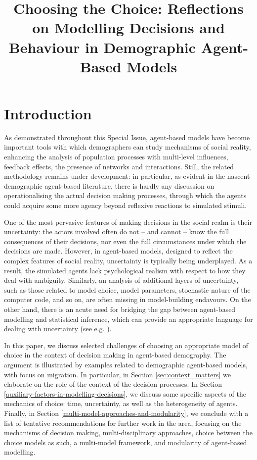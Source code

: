 \documentclass{article}
\begin{document}
\title{Choosing the Choice: Reflections on Modelling Decisions and Behaviour in Demographic Agent-Based Models}

\maketitle

\section{Introduction}
\label{sec:intro}

As demonstrated throughout this Special Issue, agent-based models have become important tools with which demographers can study mechanisms of social reality, enhancing the analysis of population processes with multi-level influences, feedback effects, the presence of networks and interactions. Still, the related methodology remains under development: in particular, as evident in the nascent demographic agent-based literature, there is hardly any discussion on operationalising the actual decision making processes, through which the agents could acquire some more agency beyond reflexive reactions to simulated stimuli. 

One of the most pervasive features of making decisions in the social realm is their uncertainty: the actors involved often do not -- and cannot -- know the full consequences of their decisions, nor even the full circumstances under which the decisions are made. However, in agent-based models, designed to reflect the complex features of social reality, uncertainty is typically being underplayed. As a result, the simulated agents lack psychological realism with respect to how they deal with ambiguity. Similarly, an analysis of additional layers of uncertainty, such as those related to model choice, model parameters, stochastic nature of the computer code, and so on, are often missing in model-building endavours. On the other hand, there is an acute need for bridging the gap between agent-based modelling and statistical inference, which can provide an appropriate language for dealing with uncertainty (see e.g. \citeauthor{Heard2015} \citeyear{Heard2015}).

In this paper, we discuss selected challenges of choosing an appropriate model of choice in the context of decision making in agent-based demography. The argument is illustrated by examples related to demographic agent-based models, with focus on migration. In particular, in Section \ref{sec:context_matters} we elaborate on the role of the context of the decision processes. In Section \ref{auxiliary-factors-in-modelling-decisions}, we discuss some specific aspects of the mechanics of choice: time, uncertainty, as well as the heterogeneity of agents. Finally, in Section \ref{multi-model-approaches-and-modularity}, we conclude with a list of tentative recommendations for further work in the area, focusing on the mechanisms of decision making, multi-disciplinary approaches, choice between the choice models as such, a multi-model framework, and modularity of agent-based modelling.
\end{document}

